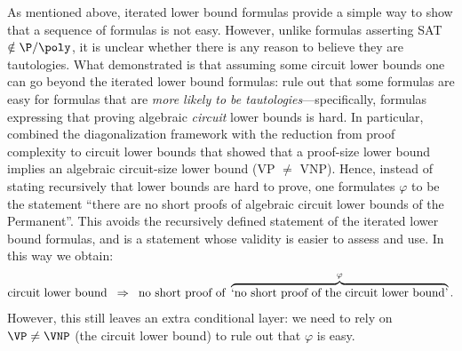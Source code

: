 \documentclass[11pt,letter]{article}
\theoremstyle{remark} %
\begin{document}
As mentioned above, iterated lower bound formulas provide a simple way to show that a sequence of formulas is not easy. However, unlike formulas asserting SAT $\notin \P/\poly$, it is unclear whether there is any reason to believe they are tautologies. %
%
%
What \cite{ST25} demonstrated is that assuming some circuit lower bounds one can go beyond the iterated lower bound formulas: rule out that some formulas are easy for formulas that are \textit{more likely to be tautologies}---specifically, formulas expressing that proving algebraic \textit{circuit} lower bounds is hard. 
In particular, \cite{ST25} combined the diagonalization framework with the \cite{GP18} reduction from proof complexity to circuit lower bounds that showed that a proof-size lower bound implies an algebraic circuit-size lower bound (VP $\neq$ VNP). 
Hence, instead of stating recursively that lower bounds are hard to prove, one formulates
$\varphi$ to be the statement ``there are no short proofs of algebraic circuit lower bounds of the Permanent''. This avoids the recursively defined statement of the iterated lower bound formulas, and is a statement whose validity is easier to assess and use.
In this way we obtain:  
\[
    \text{circuit lower bound}
    \;\;\Rightarrow\;\;
    \text{no short proof of }%
    \overbrace{%
                \text{%
                    `no short proof of the %
                    circuit lower %
                    bound'%
                    }%
              }^{\varphi}.%
\]  
However, this still leaves an extra conditional layer: we need to rely on $\VP\neq\VNP$ (the circuit lower bound) to rule out that $\varphi$ is easy.  
\bigskip
\end{document}
